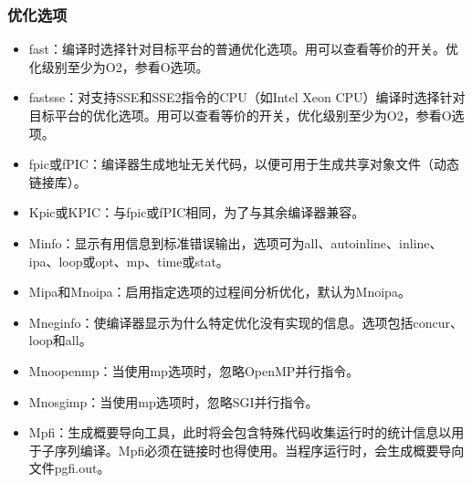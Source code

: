 \documentclass[a4paper,12pt,english]{sphinxmanual}
\begin{document}
\subsubsection{优化选项}
\label{\detokenize{compiler/pgi:id5}}\label{\detokenize{compiler/pgi:id6}}\begin{itemize}
\item {} 
\sphinxAtStartPar
\sphinxhyphen{}fast：编译时选择针对目标平台的普通优化选项。用可以查看等价的开关。优化级别至少为O2，参看\sphinxhyphen{}O选项。

\item {} 
\sphinxAtStartPar
\sphinxhyphen{}fastsse：对支持SSE和SSE2指令的CPU（如Intel Xeon CPU）编译时选择针对目标平台的优化选项。用可以查看等价的开关，优化级别至少为O2，参看\sphinxhyphen{}O选项。

\item {} 
\sphinxAtStartPar
\sphinxhyphen{}fpic或\sphinxhyphen{}fPIC：编译器生成地址无关代码，以便可用于生成共享对象文件（动态链接库）。

\item {} 
\sphinxAtStartPar
\sphinxhyphen{}Kpic或\sphinxhyphen{}KPIC：与\sphinxhyphen{}fpic或\sphinxhyphen{}fPIC相同，为了与其余编译器兼容。

\item {} 
\sphinxAtStartPar
\sphinxhyphen{}Minfo\sphinxstyleemphasis{{[}=option{[},option,…{]}{]}}：显示有用信息到标准错误输出，选项可为all、autoinline、inline、ipa、loop或opt、mp、time或stat。

\item {} 
\sphinxAtStartPar
\sphinxhyphen{}Mipa\sphinxstyleemphasis{{[}=option{[},option,…{]}{]}}和\sphinxhyphen{}Mnoipa：启用指定选项的过程间分析优化，默认为\sphinxhyphen{}Mnoipa。

\item {} 
\sphinxAtStartPar
\sphinxhyphen{}Mneginfo：使编译器显示为什么特定优化没有实现的信息。选项包括concur、loop和all。

\item {} 
\sphinxAtStartPar
\sphinxhyphen{}Mnoopenmp：当使用\sphinxhyphen{}mp选项时，忽略OpenMP并行指令。

\item {} 
\sphinxAtStartPar
\sphinxhyphen{}Mnosgimp：当使用\sphinxhyphen{}mp选项时，忽略SGI并行指令。

\item {} 
\sphinxAtStartPar
\sphinxhyphen{}Mpfi：生成概要导向工具，此时将会包含特殊代码收集运行时的统计信息以用于子序列编译。\sphinxhyphen{}Mpfi必须在链接时也得使用。当程序运行时，会生成概要导向文件pgfi.out。


\end{itemize}
\end{document}
